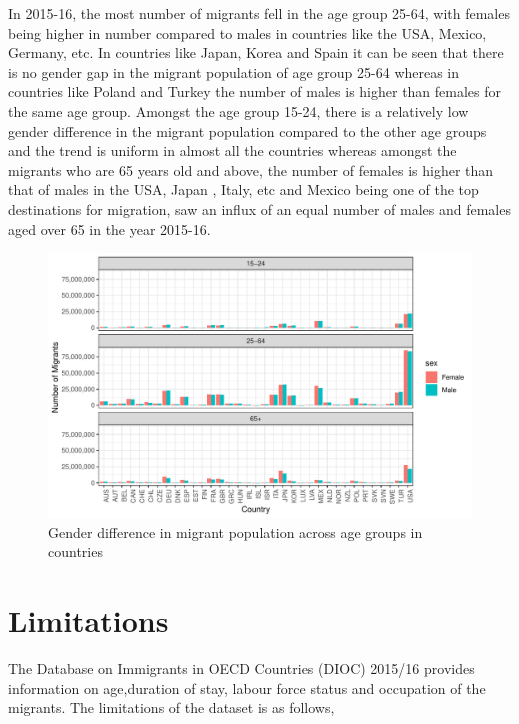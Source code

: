 \documentclass[11pt,a4paper,]{article}
\begin{document}
In 2015-16, the most number of migrants fell in the age group 25-64, with females being higher in number compared to males in countries like the USA, Mexico, Germany, etc. In countries like Japan, Korea and Spain it can be seen that there is no gender gap in the migrant population of age group 25-64 whereas in countries like Poland and Turkey the number of males is higher than females for the same age group.
Amongst the age group 15-24, there is a relatively low gender difference in the migrant population compared to the other age groups and the trend is uniform in almost all the countries whereas amongst the migrants who are 65 years old and above, the number of females is higher than that of males in the USA, Japan , Italy, etc and Mexico being one of the top destinations for migration, saw an influx of an equal number of males and females aged over 65 in the year 2015-16.

\begin{figure}
\centering
\includegraphics{ETC5513assignment4_files/figure-latex/agegap-1.pdf}
\caption{\label{fig:agegap}Gender difference in migrant population across age groups in countries}
\end{figure}

\section*{Limitations}

The Database on Immigrants in OECD Countries (DIOC) 2015/16 provides information on age,duration of stay, labour force status and occupation of the migrants. The limitations of the dataset is as follows,
\end{document}
